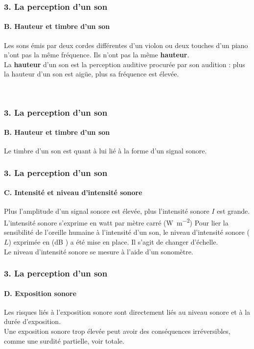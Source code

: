 \documentclass{beamer}
\begin{document}
\begin{frame}
	\frametitle{3. La perception d'un son}
	\framesubtitle{B. Hauteur et timbre d'un son}
	Les sons émis par deux cordes différentes d'un violon ou deux touches d'un piano n'ont pas la même fréquence. Ils n'ont pas la même \textbf{hauteur}.\\
	La \textbf{hauteur} d'un son est la perception auditive procurée par son audition : plus la hauteur d'un son est aigüe, plus sa fréquence est élevée.
	\begin{center}
		\\\vspace{1em}
	\end{center}
	
	
\end{frame}

\begin{frame}
	\frametitle{3. La perception d'un son}
	\framesubtitle{B. Hauteur et timbre d'un son}
	Le timbre d'un son est quant à lui lié à la forme d'un signal sonore. 
\end{frame}
\begin{frame}
	\frametitle{3. La perception d'un son}
	\framesubtitle{C. Intensité et niveau d'intensité sonore}
	Plus l’amplitude d’un signal sonore est élevée, plus l’intensité sonore $I$ est grande. L’intensité sonore
	s’exprime en watt par mètre carré (\unit{\watt\per\meter\squared})
	Pour lier la sensibilité de l’oreille humaine à l’intensité d’un
	son, le niveau d’intensité sonore ($L$) exprimée en (\unit{\deci\bel} ) a été mise en place. Il s’agit de changer d’échelle.\\
	Le niveau d’intensité sonore se mesure à l’aide d’un
	sonomètre.
\end{frame}

\begin{frame}
	\frametitle{3. La perception d'un son}
	\framesubtitle{D. Exposition sonore}
	Les risques liés à l’exposition sonore sont	directement liés au niveau sonore et à la durée d’exposition.\\
	Une exposition sonore trop élevée
	peut avoir des conséquences
	irréversibles, comme une surdité partielle, voir totale.
\end{frame}
\end{document}
